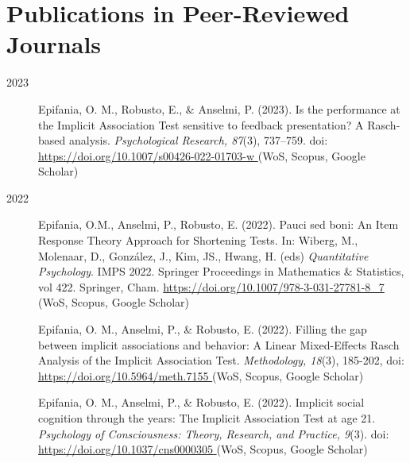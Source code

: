 \documentclass[letterpaper,12pt]{article}
\begin{document}
\section{Publications in Peer-Reviewed Journals}
\begin{description}
	\item[2023]
	
	
	\item[] Epifania, O. M., Robusto, E., \& Anselmi, P. (2023). Is the performance at the Implicit Association Test sensitive to feedback presentation? A Rasch-based analysis. \emph{Psychological
		Research, 87}(3), 737--759. doi: \href{https://doi.org/10.1007/s00426-022-01703-w}{https://doi.org/10.1007/s00426-022-01703-w } (WoS, Scopus, Google Scholar)
	
	\item[2022] 
	\item[] Epifania, O.M., Anselmi, P., Robusto, E. (2022). Pauci sed boni: An Item Response Theory Approach for Shortening Tests. In: Wiberg, M., Molenaar, D., González, J., Kim, JS., Hwang, H. (eds) \emph{Quantitative Psychology}. IMPS 2022. Springer Proceedings in Mathematics \& Statistics, vol 422. Springer, Cham. \url{https://doi.org/10.1007/978-3-031-27781-8_7 } (WoS, Scopus, Google Scholar)
	
	\item[] Epifania, O. M., Anselmi, P., \& Robusto, E. (2022). Filling the gap between implicit associations and behavior: A Linear Mixed-Effects Rasch Analysis of the Implicit Association Test. \emph{Methodology, 18}(3), 185-202, doi: \url{https://doi.org/10.5964/meth.7155 } (WoS, Scopus, Google Scholar)
	\item[] Epifania, O. M., Anselmi, P., \& Robusto, E. (2022). Implicit social cognition through the years: The Implicit Association Test at age 21. \emph{Psychology of Consciousness: Theory, Research, and Practice, 9}(3). doi: \url{https://doi.org/10.1037/cns0000305 } (WoS, Scopus, Google Scholar)
	

\end{description}
\end{document}
